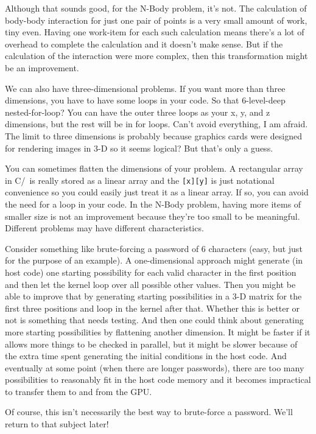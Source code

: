 Although that sounds good, for the N-Body problem, it's not. The calculation of body-body interaction for just one pair of points is a very small amount of work, tiny even. Having one work-item for each such calculation means there's a lot of overhead to complete the calculation and it doesn't make sense. But if the calculation of the interaction were more complex, then this transformation might be an improvement.

We can also have three-dimensional problems. If you want more than three dimensions, you have to have some loops in your code. So that 6-level-deep nested-for-loop? You can have the outer three loops as your x, y, and z dimensions, but the rest will be in for loops. Can't avoid everything, I am afraid. The limit to three dimensions is probably because graphics cards were designed for rendering images in 3-D so it seems logical? But that's only a guess.

You can sometimes flatten the dimensions of your problem. A rectangular array in C/\CPP~is really stored as a linear array and the \texttt{[x][y]} is just notational convenience so you could easily just treat it as a linear array. If so, you can avoid the need for a loop in your code. In the N-Body problem, having more items of smaller size is not an improvement because they're too small to be meaningful. Different problems may have different characteristics.

Consider something like brute-forcing a password of 6 characters (easy, but just for the purpose of an example). A one-dimensional approach might generate (in host code) one starting possibility for each valid character in the first position and then let the kernel loop over all possible other values. Then you might be able to improve that by generating starting possibilities in a 3-D matrix for the first three positions and loop in the kernel after that. Whether this is better or not is something that needs testing. And then one could think about generating more starting possibilities by flattening another dimension. It might be faster if it allows more things to be checked in parallel, but it might be slower because of the extra time spent generating the initial conditions in the host code. And eventually at some point (when there are longer passwords), there are too many possibilities to reasonably fit in the host code memory and it becomes impractical to transfer them to and from the GPU.

Of course, this isn't necessarily the best way to brute-force a password. We'll return to that subject later!

